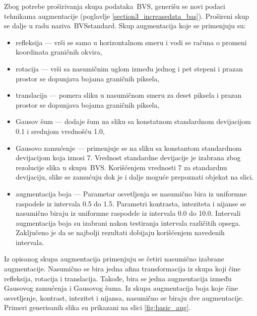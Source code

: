 \documentclass[12pt,oneside]{memoir}
\newcommand{\bvs}{\ensuremath{\,\textrm{BVS}}}
\begin{document}
Zbog potrebe proširivanja skupa podataka \bvs{}, generišu se novi podaci tehnikama augmentacije (poglavlje \ref{section3_increasedata_bas}). Prošireni skup se dalje u radu naziva \bvs{standard}.
Skup augmentacija koje se primenjuju su: 
\begin{itemize}
    \item refleksija --- vrši se samo u horizontalnom smeru i vodi se računa o promeni koordinata graničnih okvira, 
    \item rotacija --- vrši sa nasumičnim uglom između jednog i pet stepeni i prazan prostor se dopunjava bojama graničnih piksela,
    \item translacija ---  pomera sliku u nasumičnom smeru za deset piksela i prazan prostor se dopunjava bojama graničnih piksela,
    \item Gausov šum --- dodaje šum na sliku sa konstatnom standardnom devijacijom 0.1 i srednjom vrednošću 1.0,
    \item Gausovo zamućenje --- primenjuje se na sliku sa konstantom standardnom devijacijom koja iznosi 7. Vrednost standardne devijacije je izabrana zbog rezolucije slika u skupu \bvs{}. Korišćenjem vrednosti 7 za standardnu devijaciju, slike se zamućuju dok je i dalje moguće prepoznati objekat na slici.
    \item augmentacija boja --- Parametar osvetljenja se nasumično bira iz uniformne raspodele iz intervala 0.5 do 1.5. Parametri kontrasta, inteziteta i nijanse se nasumično biraju iz uniformne raspodele iz intervala 0.0 do 10.0. Intervali augmentacija boja su izabrani nakon testiranja intervala različitih opsega. Zaključeno je da se najbolji rezultati dobijaju korišćenjem navedenih intervala.
\end{itemize}

\noindent Iz opisanog skupa augmentacija primenjuju se četiri nasumično izabrane augmentacije. Nasumično se bira jedna afina transformacija iz skupa koji čine refleksija, rotacija i translacija. Takođe, bira se jedna augmentacija između Gausovog zamućenja i Gausovog šuma. Iz skupa augmentacija boja koje čine osvetljenje, kontrast, intezitet i nijansa, nasumično se biraju dve augmentacije. Primeri generisanih slika su prikazani na slici \ref{fig:basic_aug}.
\end{document}
